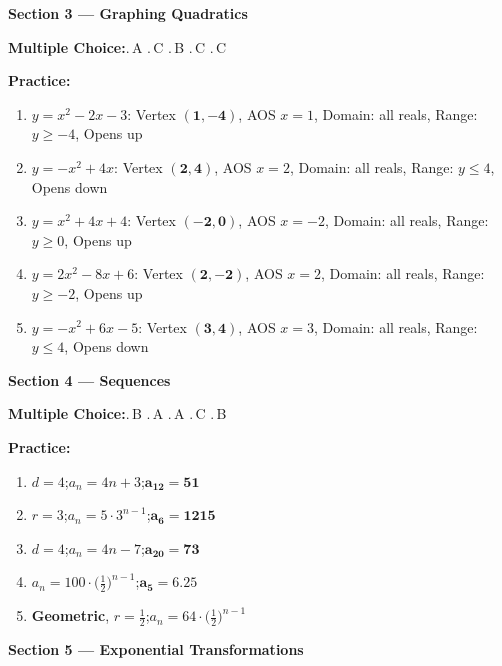 \documentclass[12pt,letterpaper]{article}
\begin{document}
\vspace{6pt}
\textbf{\color{navyblue}Section 3 --- Graphing Quadratics}

\smallskip
\textbf{Multiple Choice:}.\,A .\,C .\,B .\,C .\,C

\smallskip
\textbf{Practice:}
\begin{enumerate}[label=\arabic*., leftmargin=*, itemsep=3pt, topsep=2pt]
  \item $y=x^2-2x-3$: Vertex $\boldsymbol{(1,-4)}$, AOS $x=1$, Domain: all reals, Range: $y\ge -4$, Opens up
  \item $y=-x^2+4x$: Vertex $\boldsymbol{(2,4)}$, AOS $x=2$, Domain: all reals, Range: $y\le 4$, Opens down
  \item $y=x^2+4x+4$: Vertex $\boldsymbol{(-2,0)}$, AOS $x=-2$, Domain: all reals, Range: $y\ge 0$, Opens up
  \item $y=2x^2-8x+6$: Vertex $\boldsymbol{(2,-2)}$, AOS $x=2$, Domain: all reals, Range: $y\ge -2$, Opens up
  \item $y=-x^2+6x-5$: Vertex $\boldsymbol{(3,4)}$, AOS $x=3$, Domain: all reals, Range: $y\le 4$, Opens down
\end{enumerate}

\vspace{6pt}
\textbf{\color{navyblue}Section 4 --- Sequences}

\smallskip
\textbf{Multiple Choice:}.\,B .\,A .\,A .\,C .\,B

\smallskip
\textbf{Practice:}
\begin{enumerate}[label=\arabic*., leftmargin=*, itemsep=3pt, topsep=2pt]
  \item $d=4$;\quad $a_n=4n+3$;\quad $\boldsymbol{a_{12}=51}$
  \item $r=3$;\quad $a_n=5\cdot 3^{n-1}$;\quad $\boldsymbol{a_6=1215}$
  \item $d=4$;\quad $a_n=4n-7$;\quad $\boldsymbol{a_{20}=73}$
  \item $a_n=100\cdot\bigl(\tfrac{1}{2}\bigr)^{n-1}$;\quad $\boldsymbol{a_5=6.25}$
  \item \textbf{Geometric}, $r=\tfrac{1}{2}$;\quad $a_n=64\cdot\bigl(\tfrac{1}{2}\bigr)^{n-1}$
\end{enumerate}

\vspace{6pt}
\textbf{\color{navyblue}Section 5 --- Exponential Transformations}
\end{document}
